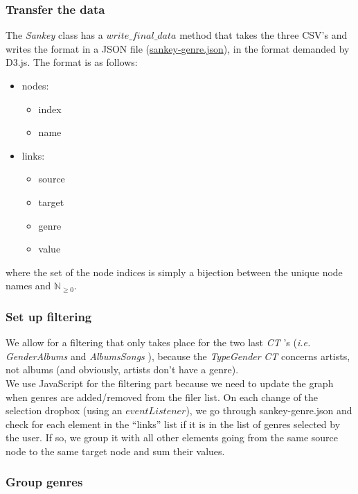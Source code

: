 \documentclass{article}
\newcommand{\N}{\mathbb{N}}
\newcommand{\ie}{\textit{i.e. }}
\newcommand{\tg}{\textit{TypeGender }}
\newcommand{\ga}{\textit{GenderAlbums }}
\newcommand{\as}{\textit{AlbumsSongs }}
\newcommand{\sk}{\textit{Sankey }}
\newcommand{\ct}{\textit{CT }}
\begin{document}
\subsubsection{Transfer the data}
The \sk class has a \(write\_final\_data\) method that takes the three CSV's and writes the format in a JSON file (\href{https://github.com/jorislimonier/collab-viz/blob/main/joris/sankey-genre.json}{sankey-genre.json}), in the format demanded by D3.js. The format is as follows:
\begin{itemize}
    \item nodes:
          \begin{itemize}
              \item index
              \item name
          \end{itemize}
    \item links:
          \begin{itemize}
              \item source
              \item target
              \item genre
              \item value
          \end{itemize}
\end{itemize}
where the set of the node indices is simply a bijection between the unique node names and \(\N_{\geq 0}\).

\subsubsection{Set up filtering}
We allow for a filtering that only takes place for the two last \ct's (\ie \ga and \as), because the \tg \ct concerns artists, not albums (and obviously, artists don't have a genre). \\
We use JavaScript for the filtering part because we need to update the graph when genres are added/removed from the filer list. On each change of the selection dropbox (using an \(eventListener\)), we go through sankey-genre.json and check for each element in the ``links'' list if it is in the list of genres selected by the user. If so, we group it with all other elements going from the same source node to the same target node and sum their values.

 \subsubsection{Group genres}
\end{document}
